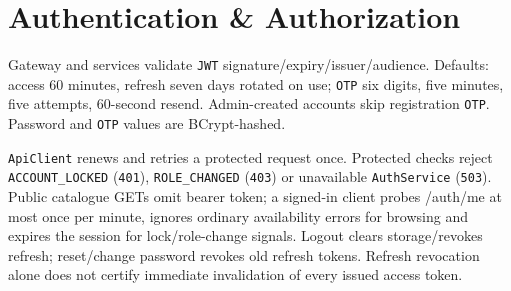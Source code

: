 \clearpage
\section{Authentication \& Authorization}\label{sec:srs-16}
Gateway and services validate \texttt{JWT} signature/\allowbreak{}expiry/\allowbreak{}issuer/\allowbreak{}audience. Defaults: access 60 minutes, refresh seven days rotated on use; \texttt{OTP} six digits, five minutes, five attempts, 60-second resend. Admin-created accounts skip registration \texttt{OTP}. Password and \texttt{OTP} values are BCrypt-hashed.

\texttt{Api\allowbreak{}Client} renews and retries a protected request once. Protected checks reject \texttt{ACCOUNT\_\allowbreak{}LOCKED} (\texttt{401}), \texttt{ROLE\_\allowbreak{}CHANGED} (\texttt{403}) or unavailable \texttt{Auth\allowbreak{}Service} (\texttt{503}). Public catalogue GETs omit bearer token; a signed-in client probes /\allowbreak{}auth/\allowbreak{}me at most once per minute, ignores ordinary availability errors for browsing and expires the session for lock/\allowbreak{}role-change signals. Logout clears storage/\allowbreak{}revokes refresh; reset/\allowbreak{}change password revokes old refresh tokens. Refresh revocation alone does not certify immediate invalidation of every issued access token.
